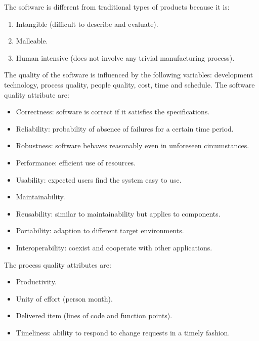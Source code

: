 \documentclass[12pt, a4paper]{report}
\begin{document}
    The software is different from traditional types of products because it is: 
    \begin{enumerate}
        \item Intangible (difficult to describe and evaluate).
        \item Malleable.
        \item Human intensive (does not involve any trivial manufacturing process).
    \end{enumerate}
    The quality of the software is influenced by the following variables: development technology, process quality, people quality, 
    cost, time and schedule. The software quality attribute are:
    \begin{itemize}
        \item Correctness: software is correct if it satisfies the specifications.
        \item Reliability: probability of absence of failures for a certain time period.
        \item Robustness: software behaves reasonably even in unforeseen circumstances.
        \item Performance: efficient use of resources.
        \item Usability: expected users find the system easy to use.
        \item Maintainability.
        \item Reusability: similar to maintainability but applies to components.
        \item Portability: adaption to different target environments.
        \item Interoperability: coexist and cooperate with other applications. 
    \end{itemize}
    The process quality attributes are:
    \begin{itemize}
        \item Productivity.
        \item Unity of effort (person month).
        \item Delivered item (lines of code and function points).
        \item Timeliness: ability to respond to change requests in a timely fashion.
    \end{itemize}
\end{document}
